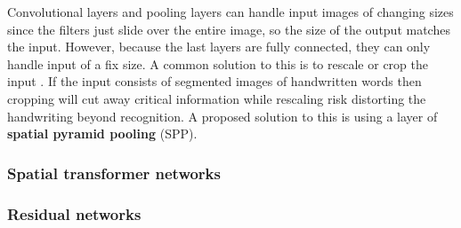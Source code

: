 Convolutional layers and pooling layers can handle input images of changing sizes since the filters just slide over the entire image, so the size of the output matches the input.
However, because the last layers are fully connected, they can only handle input of a fix size. A common solution to this is to rescale or crop the input \cite{FornesCnnCategorization}. If the input consists of segmented images of handwritten words then cropping will cut away critical information while rescaling risk distorting the handwriting beyond recognition. A proposed solution to this is using a layer of \textbf{spatial pyramid pooling} (SPP).

\subsubsection{Spatial transformer networks}


\subsubsection{Residual networks}

